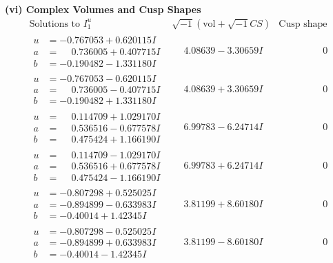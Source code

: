 \documentclass[1p]{elsarticle_modified}
\theoremstyle{definition}
\newcommand{\I}{\sqrt{-1}}
\begin{document}
\newpage\flushleft \textbf{(vi) Complex Volumes and Cusp Shapes}
$$\begin{array}{c|c|c}  
\text{Solutions to }I^u_{1}& \I (\text{vol} + \sqrt{-1}CS) & \text{Cusp shape}\\
 \hline 
\begin{aligned}
u &= -0.767053 + 0.620115 I \\
a &= \phantom{-}0.736005 + 0.407715 I \\
b &= -0.190482 - 1.331180 I\end{aligned}
 & \phantom{-}4.08639 - 3.30659 I & \phantom{-0.000000 } 0 \\ \hline\begin{aligned}
u &= -0.767053 - 0.620115 I \\
a &= \phantom{-}0.736005 - 0.407715 I \\
b &= -0.190482 + 1.331180 I\end{aligned}
 & \phantom{-}4.08639 + 3.30659 I & \phantom{-0.000000 } 0 \\ \hline\begin{aligned}
u &= \phantom{-}0.114709 + 1.029170 I \\
a &= \phantom{-}0.536516 - 0.677578 I \\
b &= \phantom{-}0.475424 + 1.166190 I\end{aligned}
 & \phantom{-}6.99783 - 6.24714 I & \phantom{-0.000000 } 0 \\ \hline\begin{aligned}
u &= \phantom{-}0.114709 - 1.029170 I \\
a &= \phantom{-}0.536516 + 0.677578 I \\
b &= \phantom{-}0.475424 - 1.166190 I\end{aligned}
 & \phantom{-}6.99783 + 6.24714 I & \phantom{-0.000000 } 0 \\ \hline\begin{aligned}
u &= -0.807298 + 0.525025 I \\
a &= -0.894899 - 0.633983 I \\
b &= -0.40014 + 1.42345 I\end{aligned}
 & \phantom{-}3.81199 + 8.60180 I & \phantom{-0.000000 } 0 \\ \hline\begin{aligned}
u &= -0.807298 - 0.525025 I \\
a &= -0.894899 + 0.633983 I \\
b &= -0.40014 - 1.42345 I\end{aligned}
 & \phantom{-}3.81199 - 8.60180 I & \phantom{-0.000000 } 0 \\ \hline\begin{aligned}

\end{aligned}
\end{array}$$
\end{document}
